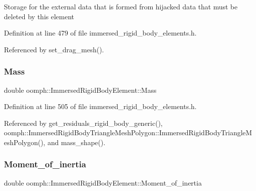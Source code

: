 Storage for the external data that is formed from hijacked data that must be deleted by this element 

Definition at line 479 of file immersed\+\_\+rigid\+\_\+body\+\_\+elements.\+h.



Referenced by set\+\_\+drag\+\_\+mesh().

\mbox{\label{classoomph_1_1ImmersedRigidBodyElement_ac2dcda38cf2bd20d0a6bb830a6fde91f}} 
\subsubsection{\texorpdfstring{Mass}{Mass}}
{\footnotesize\ttfamily double oomph\+::\+Immersed\+Rigid\+Body\+Element\+::\+Mass\hspace{0.3cm}{\ttfamily [protected]}}



Definition at line 505 of file immersed\+\_\+rigid\+\_\+body\+\_\+elements.\+h.



Referenced by get\+\_\+residuals\+\_\+rigid\+\_\+body\+\_\+generic(), oomph\+::\+Immersed\+Rigid\+Body\+Triangle\+Mesh\+Polygon\+::\+Immersed\+Rigid\+Body\+Triangle\+Mesh\+Polygon(), and mass\+\_\+shape().

\mbox{\label{classoomph_1_1ImmersedRigidBodyElement_ab410ae35b8e4c034ed721731c8a165a6}} 
\subsubsection{\texorpdfstring{Moment\+\_\+of\+\_\+inertia}{Moment\_of\_inertia}}
{\footnotesize\ttfamily double oomph\+::\+Immersed\+Rigid\+Body\+Element\+::\+Moment\+\_\+of\+\_\+inertia\hspace{0.3cm}{\ttfamily [protected]}}



